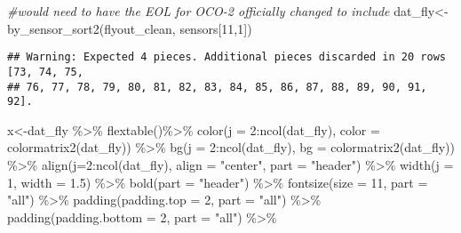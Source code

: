 \documentclass[
]{article}
\newenvironment{Shaded}{\begin{snugshade}}{\end{snugshade}}
\newcommand{\AttributeTok}[1]{\textcolor[rgb]{0.77,0.63,0.00}{#1}}
\newcommand{\CommentTok}[1]{\textcolor[rgb]{0.56,0.35,0.01}{\textit{#1}}}
\newcommand{\DecValTok}[1]{\textcolor[rgb]{0.00,0.00,0.81}{#1}}
\newcommand{\FloatTok}[1]{\textcolor[rgb]{0.00,0.00,0.81}{#1}}
\newcommand{\FunctionTok}[1]{\textcolor[rgb]{0.00,0.00,0.00}{#1}}
\newcommand{\NormalTok}[1]{#1}
\newcommand{\OtherTok}[1]{\textcolor[rgb]{0.56,0.35,0.01}{#1}}
\newcommand{\SpecialCharTok}[1]{\textcolor[rgb]{0.00,0.00,0.00}{#1}}
\newcommand{\StringTok}[1]{\textcolor[rgb]{0.31,0.60,0.02}{#1}}
\begin{document}
\begin{Shaded}
\begin{Highlighting}[]
\CommentTok{\#would need to have the EOL for OCO{-}2 officially changed to include}
\NormalTok{dat\_fly}\OtherTok{\textless{}{-}}\FunctionTok{by\_sensor\_sort2}\NormalTok{(flyout\_clean, sensors[}\DecValTok{11}\NormalTok{,}\DecValTok{1}\NormalTok{])}
\end{Highlighting}
\end{Shaded}

\begin{verbatim}
## Warning: Expected 4 pieces. Additional pieces discarded in 20 rows [73, 74, 75,
## 76, 77, 78, 79, 80, 81, 82, 83, 84, 85, 86, 87, 88, 89, 90, 91, 92].
\end{verbatim}

\begin{Shaded}
\begin{Highlighting}[]
\NormalTok{x}\OtherTok{\textless{}{-}}\NormalTok{dat\_fly }\SpecialCharTok{\%\textgreater{}\%}
    \FunctionTok{flextable}\NormalTok{()}\SpecialCharTok{\%\textgreater{}\%}
    \FunctionTok{color}\NormalTok{(}\AttributeTok{j =} \DecValTok{2}\SpecialCharTok{:}\FunctionTok{ncol}\NormalTok{(dat\_fly), }\AttributeTok{color =} \FunctionTok{colormatrix2}\NormalTok{(dat\_fly)) }\SpecialCharTok{\%\textgreater{}\%}
    \FunctionTok{bg}\NormalTok{(}\AttributeTok{j =} \DecValTok{2}\SpecialCharTok{:}\FunctionTok{ncol}\NormalTok{(dat\_fly), }\AttributeTok{bg =} \FunctionTok{colormatrix2}\NormalTok{(dat\_fly)) }\SpecialCharTok{\%\textgreater{}\%}
    \FunctionTok{align}\NormalTok{(}\AttributeTok{j=}\DecValTok{2}\SpecialCharTok{:}\FunctionTok{ncol}\NormalTok{(dat\_fly), }\AttributeTok{align =} \StringTok{"center"}\NormalTok{, }\AttributeTok{part =} \StringTok{"header"}\NormalTok{) }\SpecialCharTok{\%\textgreater{}\%}
    \FunctionTok{width}\NormalTok{(}\AttributeTok{j =} \DecValTok{1}\NormalTok{, }\AttributeTok{width =} \FloatTok{1.5}\NormalTok{) }\SpecialCharTok{\%\textgreater{}\%}
    \FunctionTok{bold}\NormalTok{(}\AttributeTok{part =} \StringTok{"header"}\NormalTok{) }\SpecialCharTok{\%\textgreater{}\%}
    \FunctionTok{fontsize}\NormalTok{(}\AttributeTok{size =} \DecValTok{11}\NormalTok{, }\AttributeTok{part =} \StringTok{"all"}\NormalTok{) }\SpecialCharTok{\%\textgreater{}\%}
    \FunctionTok{padding}\NormalTok{(}\AttributeTok{padding.top =} \DecValTok{2}\NormalTok{, }\AttributeTok{part =} \StringTok{"all"}\NormalTok{) }\SpecialCharTok{\%\textgreater{}\%}
    \FunctionTok{padding}\NormalTok{(}\AttributeTok{padding.bottom =} \DecValTok{2}\NormalTok{, }\AttributeTok{part =} \StringTok{"all"}\NormalTok{) }\SpecialCharTok{\%\textgreater{}\%}

\end{Highlighting}
\end{Shaded}
\end{document}
